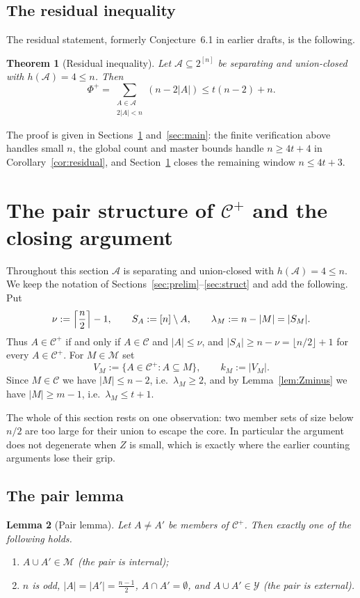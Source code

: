\documentclass[11pt,a4paper]{amsart}
\theoremstyle{plain}
\newtheorem{theorem}{Theorem}[section]
\newtheorem{lemma}[theorem]{Lemma}
\theoremstyle{definition}
\newcommand{\A}{\mathcal{A}}
\newcommand{\Cc}{\mathcal{C}}
\newcommand{\Mm}{\mathcal{M}}
\newcommand{\Yy}{\mathcal{Y}}
\newcommand{\Cp}{\Cc^{+}}
\begin{document}
\subsection*{The residual inequality}

The residual statement, formerly Conjecture~6.1 in earlier drafts, is the
following.

\begin{theorem}[Residual inequality]\label{thm:residual}
Let $\A\subseteq2^{[n]}$ be separating and union-closed with $h(\A)=4\le n$. Then
\[
  \Phi^+
  =
  \sum_{\substack{A\in\A\\2|A|<n}}(n-2|A|)
  \le
  t(n-2)+n.
\]
\end{theorem}

The proof is given in Sections~\ref{sec:closing} and~\ref{sec:main}: the finite
verification above handles small $n$, the global count and master bounds
handle $n\ge4t+4$ in Corollary~\ref{cor:residual}, and
Section~\ref{sec:closing} closes the remaining window
$n\le4t+3$.

\section{The pair structure of \texorpdfstring{$\Cc^+$}{C+} and the closing argument}
\label{sec:closing}

Throughout this section $\A$ is separating and union-closed with
$h(\A)=4\le n$. We keep the notation of Sections~\ref{sec:prelim}--\ref{sec:struct}
and add the following. Put
\[
  \nu:=\Bigl\lceil\frac n2\Bigr\rceil-1,
  \qquad
  S_A:=[n]\setminus A,
  \qquad
  \lambda_M:=n-|M|=|S_M|.
\]
Thus $A\in\Cp$ if and only if $A\in\Cc$ and $|A|\le\nu$, and
$|S_A|\ge n-\nu=\lfloor n/2\rfloor+1$ for every $A\in\Cp$. For $M\in\Mm$ set
\[
  V_M:=\{A\in\Cp:A\subseteq M\},
  \qquad
  k_M:=|V_M|.
\]
Since $M\in\Cc$ we have $|M|\le n-2$, i.e.\ $\lambda_M\ge2$, and by
Lemma~\ref{lem:Zminus} we have $|M|\ge m-1$, i.e.\ $\lambda_M\le t+1$.

The whole of this section rests on one observation: two member sets of size
below $n/2$ are too large for their union to escape the core. In particular the
argument does not degenerate when $Z$ is small, which is exactly where the
earlier counting arguments lose their grip.

\subsection*{The pair lemma}

\begin{lemma}[Pair lemma]\label{lem:pair}
Let $A\ne A'$ be members of $\Cp$. Then exactly one of the following holds.
\begin{enumerate}
\item[\rm(i)] $A\cup A'\in\Mm$ \hfill \emph{(the pair is internal)};
\item[\rm(ii)] $n$ is odd, $|A|=|A'|=\frac{n-1}{2}$,
$A\cap A'=\emptyset$, and $A\cup A'\in\Yy$ \hfill \emph{(the pair is external)}.
\end{enumerate}
\end{lemma}
\end{document}
